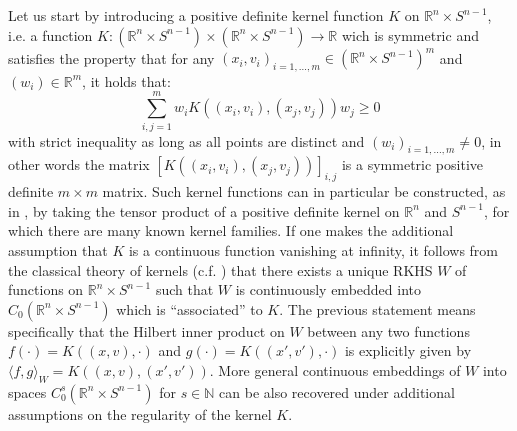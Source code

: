 \documentclass[11pt]{article}
\newcommand{\R}{\mathbb{R}}
\begin{document}
Let us start by introducing a positive definite kernel function $K$ on $\R^n \times S^{n-1}$, i.e. a function $K:(\R^n \times S^{n-1}) \times (\R^n \times S^{n-1}) \rightarrow \R$ wich is symmetric and satisfies the property that for any $(x_i,v_i)_{i=1,\ldots,m} \in (\R^n \times S^{n-1})^m$ and $(w_i) \in \R^m$, it holds that:
\begin{equation*}
 \sum_{i,j=1}^{m} w_i K((x_i,v_i),(x_j,v_j)) w_j \geq 0
\end{equation*}
with strict inequality as long as all points are distinct and $(w_i)_{i=1,\ldots,m} \neq 0$, in other words the matrix $[K((x_i,v_i),(x_j,v_j))]_{i,j}$ is a symmetric positive definite $m\times m$ matrix. Such kernel functions can in particular be constructed, as in \cite{charon2013varifold,kaltenmark2017general}, by taking the tensor product of a positive definite kernel on $\R^n$ and $S^{n-1}$, for which there are many known kernel families. If one makes the additional assumption that $K$ is a continuous function vanishing at infinity, it follows from the classical theory of kernels (c.f. \cite{younes2019shapes}) that there exists a unique RKHS $W$ of functions on $\R^n \times S^{n-1}$ such that $W$ is continuously embedded into $C_0(\R^n \times S^{n-1})$ which is ``associated'' to $K$. The previous statement means specifically that the Hilbert inner product on $W$ between any two functions $f(\cdot) = K((x,v), \cdot)$ and $g(\cdot) = K((x',v'), \cdot)$ is explicitly given by $\langle f,g \rangle_W = K((x,v),(x',v'))$. More general continuous embeddings of $W$ into spaces $C_0^s(\R^n \times S^{n-1})$ for $s \in \mathbb{N}$ can be also recovered under additional assumptions on the regularity of the kernel $K$.
\end{document}
